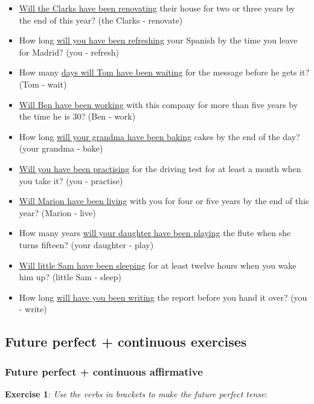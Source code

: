 \begin{itemize}

\item \underline{Will the Clarks have been renovating} their house for two or three years by the end of this year? (the Clarks - renovate)
\item How long \underline{will you have been refreshing} your Spanish by the time you leave for Madrid? (you - refresh)
\item How many \underline{days will Tom have been waiting} for the message before he gets it? (Tom - wait)
\item \underline{Will Ben have been working}  with this company for more than five years by the 
time he is 30? (Ben - work)
\item How long \underline{will your grandma have been baking} cakes by the end of the day? (your grandma - bake)
\item \underline{Will you have been practising}  for the driving test for at least a month when you take it? (you - practise)
\item \underline{Will Marion have been living}  with you for four or five years by the end of this year? (Marion - live)
\item How many years \underline{will your daughter have been playing} the flute when she turns fifteen? (your daughter - play) 
\item \underline{Will little Sam have been sleeping} for at least twelve hours when you wake him up? (little Sam - sleep) 
\item How long \underline{will have you been writing} the report before you hand it over? (you - write) 

\end{itemize}

\subsection{Future perfect + continuous exercises}

\subsubsection{Future perfect + continuous affirmative}

\textbf{Exercise 1}: \textit{Use the verbs in brackets to make  the future perfect tense}:


